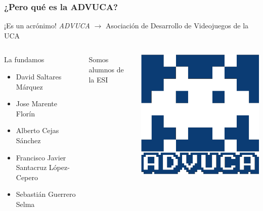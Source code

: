 
\begin{frame}
    \frametitle{¿Pero qué es la ADVUCA?}
    
    \begin{center}
        \begin{alertblock}{¡Es un acrónimo!}
            \emph{ADVUCA} $\rightarrow$ Asociación de Desarrollo de Videojuegos de la UCA
        \end{alertblock}        
    \end{center}
    
    \begin{columns}[c]
		\column{150pt}
		\begin{block}{La fundamos}
            \begin{itemize}
                \item David Saltares Márquez
                \item Jose Marente Florín
                \item Alberto Cejas Sánchez
                \item Francisco Javier Santacruz López-Cepero
                \item Sebastián Guerrero Selma
            \end{itemize}            
        \end{block}
	\begin{center}
	    Somos alumnos de la ESI
	\end{center}
		\column{150pt}
		\begin{center}
			\includegraphics[scale=0.2]{img/advuca.png}
		\end{center}
	\end{columns} 
\end{frame}

